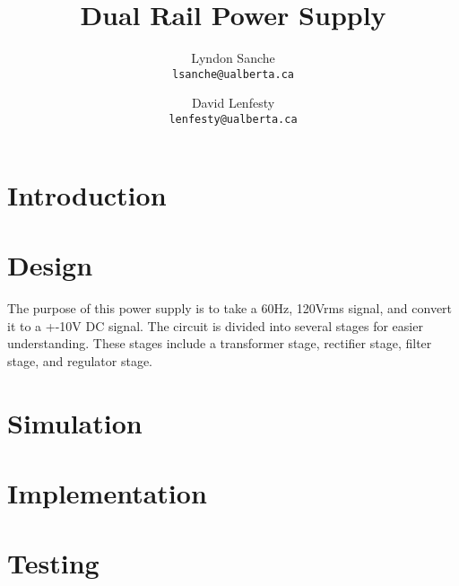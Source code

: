 \documentclass{article}
\title{Dual Rail Power Supply}
\author{
    Lyndon Sanche\\
    \texttt{lsanche@ualberta.ca}
    \and
    David Lenfesty\\
    \texttt{lenfesty@ualberta.ca}
}
\begin{document}
\maketitle
\newpage
\tableofcontents

\section{Introduction}

\section{Design}
The purpose of this power supply is to take a 60Hz, 120Vrms signal, and convert it to a +-10V DC signal. The circuit is divided into
several stages for easier understanding. These stages include a transformer stage, rectifier stage, filter stage, and regulator stage.


\section{Simulation}

\section{Implementation}

\section{Testing}
\end{document}
